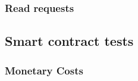 
\subsubsection{Read requests}

\subsection{Smart contract tests}
\label{section:smart-contract-tests}

\subsubsection{Monetary Costs}

